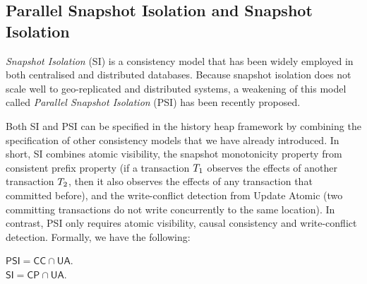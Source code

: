
%


\subsection{Parallel Snapshot Isolation and Snapshot Isolation}
\emph{Snapshot Isolation} (SI) is a consistency model that has been 
widely employed in both centralised and distributed databases. 
Because snapshot isolation does not scale well to 
geo-replicated and distributed systems, a weakening of this model 
called \emph{Parallel Snapshot Isolation} (PSI) has been recently proposed. 

Both SI and PSI can be specified in the history heap framework by combining 
the specification of other consistency models that we have already introduced. 
In short, SI combines atomic visibility, the snapshot monotonicity property from 
consistent prefix property (if a transaction $T_1$ 
observes the effects of another transaction $T_2$, then it also observes 
the effects of any transaction that committed before), and the write-conflict 
detection from Update Atomic (two committing transactions do not write 
concurrently to the same location). In contrast, PSI only requires atomic 
visibility, causal consistency and write-conflict detection. Formally, we have 
the following:
\begin{definition}
$\mathsf{PSI} = \mathsf{CC} \cap \mathsf{UA}$. \\
$\mathsf{SI} = \mathsf{CP} \cap \mathsf{UA}$.
\end{definition}

